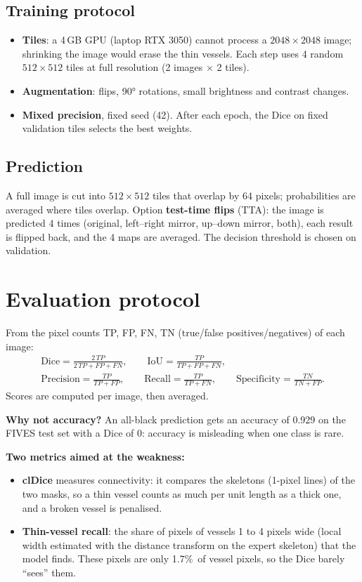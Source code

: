 \documentclass[11pt,a4paper]{article}
\newcommand{\pct}{\%}
\begin{document}
\subsection{Training protocol}
\begin{itemize}
  \item \textbf{Tiles}: a 4\,GB GPU (laptop RTX 3050) cannot process a $2048\times2048$ image; shrinking the image would erase the thin vessels. Each step uses 4 random $512\times512$ tiles at full resolution (2 images $\times$ 2 tiles).
  \item \textbf{Augmentation}: flips, 90° rotations, small brightness and contrast changes.
  \item \textbf{Mixed precision}, fixed seed (42). After each epoch, the Dice on fixed validation tiles selects the best weights.
\end{itemize}

\subsection{Prediction}
A full image is cut into $512\times512$ tiles that overlap by 64 pixels; probabilities are averaged where tiles overlap. Option \textbf{test-time flips} (TTA): the image is predicted 4 times (original, left--right mirror, up--down mirror, both), each result is flipped back, and the 4 maps are averaged. The decision threshold is chosen on validation.

\section{Evaluation protocol}

From the pixel counts TP, FP, FN, TN (true/false positives/negatives) of each image:
\begin{gather*}
\text{Dice}=\frac{2\,TP}{2\,TP+FP+FN},\qquad
\text{IoU}=\frac{TP}{TP+FP+FN},\\[4pt]
\text{Precision}=\frac{TP}{TP+FP},\qquad
\text{Recall}=\frac{TP}{TP+FN},\qquad
\text{Specificity}=\frac{TN}{TN+FP}.
\end{gather*}
Scores are computed per image, then averaged.

\textbf{Why not accuracy?} An all-black prediction gets an accuracy of 0.929 on the FIVES test set with a Dice of 0: accuracy is misleading when one class is rare.

\textbf{Two metrics aimed at the weakness:}
\begin{itemize}
  \item \textbf{clDice} \cite{cldice} measures connectivity: it compares the skeletons (1-pixel lines) of the two masks, so a thin vessel counts as much per unit length as a thick one, and a broken vessel is penalised.
  \item \textbf{Thin-vessel recall}: the share of pixels of vessels 1 to 4 pixels wide (local width estimated with the distance transform on the expert skeleton) that the model finds. These pixels are only 1.7\pct\ of vessel pixels, so the Dice barely ``sees'' them.
\end{itemize}
\end{document}
